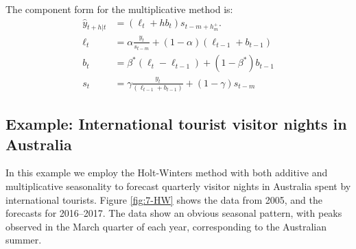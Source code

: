 \documentclass[]{book}
\newenvironment{Shaded}{\begin{snugshade}}{\end{snugshade}}
\newcommand{\DataTypeTok}[1]{\textcolor[rgb]{0.13,0.29,0.53}{#1}}
\newcommand{\DecValTok}[1]{\textcolor[rgb]{0.00,0.00,0.81}{#1}}
\newcommand{\KeywordTok}[1]{\textcolor[rgb]{0.13,0.29,0.53}{\textbf{#1}}}
\newcommand{\NormalTok}[1]{#1}
\newcommand{\OperatorTok}[1]{\textcolor[rgb]{0.81,0.36,0.00}{\textbf{#1}}}
\newcommand{\StringTok}[1]{\textcolor[rgb]{0.31,0.60,0.02}{#1}}
\begin{document}
The component form for the multiplicative method is:
\begin{align*}
  \hat{y}_{t+h|t} &= (\ell_{t} + hb_{t})s_{t-m+h_{m}^{+}}. \\
  \ell_{t} &= \alpha \frac{y_{t}}{s_{t-m}} + (1 - \alpha)(\ell_{t-1} + b_{t-1})\\
  b_{t} &= \beta^*(\ell_{t}-\ell_{t-1}) + (1 - \beta^*)b_{t-1}                \\
  s_{t} &= \gamma \frac{y_{t}}{(\ell_{t-1} + b_{t-1})} + (1 - \gamma)s_{t-m}
\end{align*}

\hypertarget{example-international-tourist-visitor-nights-in-australia}{%
\subsection*{Example: International tourist visitor nights in Australia}\label{example-international-tourist-visitor-nights-in-australia}}

In this example we employ the Holt-Winters method with both additive and multiplicative seasonality to forecast quarterly visitor nights in Australia spent by international tourists. Figure \ref{fig:7-HW} shows the data from 2005, and the forecasts for 2016--2017. The data show an obvious seasonal pattern, with peaks observed in the March quarter of each year, corresponding to the Australian summer.

\begin{Shaded}
\end{Shaded}
\end{document}
